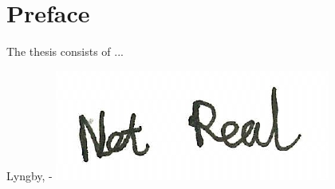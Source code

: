 \chapter{Preface}

The thesis consists of ...
\vspace{20mm}
\begin{center}
    \hspace{20mm} Lyngby, \thesishandin-\thesisyear
    \vspace{5mm}
    \newline
    \includegraphics[scale=0.5]{figures/signaturedummy}
\end{center}
\begin{flushright}
    \thesisauthor
\end{flushright}
